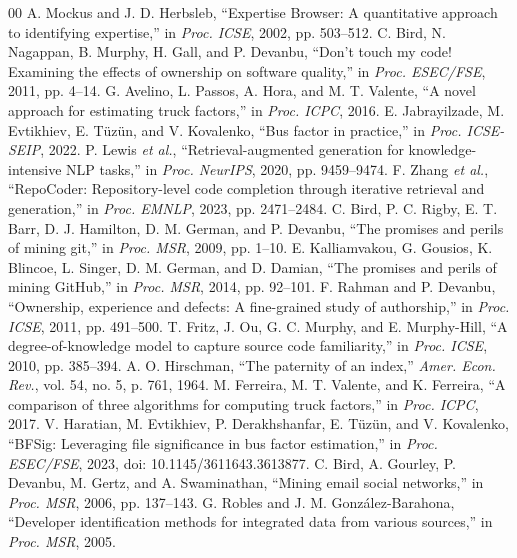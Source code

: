 \documentclass[conference]{IEEEtran}
\begin{document}
\begin{thebibliography}{00}
 A. Mockus and J. D. Herbsleb, ``Expertise Browser: A quantitative approach to identifying expertise,'' in \textit{Proc. ICSE}, 2002, pp. 503--512.
 C. Bird, N. Nagappan, B. Murphy, H. Gall, and P. Devanbu, ``Don't touch my code! Examining the effects of ownership on software quality,'' in \textit{Proc. ESEC/FSE}, 2011, pp. 4--14.
 G. Avelino, L. Passos, A. Hora, and M. T. Valente, ``A novel approach for estimating truck factors,'' in \textit{Proc. ICPC}, 2016.
 E. Jabrayilzade, M. Evtikhiev, E. T\"uz\"un, and V. Kovalenko, ``Bus factor in practice,'' in \textit{Proc. ICSE-SEIP}, 2022.
 P. Lewis \textit{et al.}, ``Retrieval-augmented generation for knowledge-intensive NLP tasks,'' in \textit{Proc. NeurIPS}, 2020, pp. 9459--9474.
 F. Zhang \textit{et al.}, ``RepoCoder: Repository-level code completion through iterative retrieval and generation,'' in \textit{Proc. EMNLP}, 2023, pp. 2471--2484.
 C. Bird, P. C. Rigby, E. T. Barr, D. J. Hamilton, D. M. German, and P. Devanbu, ``The promises and perils of mining git,'' in \textit{Proc. MSR}, 2009, pp. 1--10.
 E. Kalliamvakou, G. Gousios, K. Blincoe, L. Singer, D. M. German, and D. Damian, ``The promises and perils of mining GitHub,'' in \textit{Proc. MSR}, 2014, pp. 92--101.
 F. Rahman and P. Devanbu, ``Ownership, experience and defects: A fine-grained study of authorship,'' in \textit{Proc. ICSE}, 2011, pp. 491--500.
 T. Fritz, J. Ou, G. C. Murphy, and E. Murphy-Hill, ``A degree-of-knowledge model to capture source code familiarity,'' in \textit{Proc. ICSE}, 2010, pp. 385--394.
 A. O. Hirschman, ``The paternity of an index,'' \textit{Amer. Econ. Rev.}, vol. 54, no. 5, p. 761, 1964.
 M. Ferreira, M. T. Valente, and K. Ferreira, ``A comparison of three algorithms for computing truck factors,'' in \textit{Proc. ICPC}, 2017.
 V. Haratian, M. Evtikhiev, P. Derakhshanfar, E. T\"uz\"un, and V. Kovalenko, ``BFSig: Leveraging file significance in bus factor estimation,'' in \textit{Proc. ESEC/FSE}, 2023, doi: 10.1145/3611643.3613877.
 C. Bird, A. Gourley, P. Devanbu, M. Gertz, and A. Swaminathan, ``Mining email social networks,'' in \textit{Proc. MSR}, 2006, pp. 137--143.
 G. Robles and J. M. Gonz\'alez-Barahona, ``Developer identification methods for integrated data from various sources,'' in \textit{Proc. MSR}, 2005.

\end{thebibliography}
\end{document}
